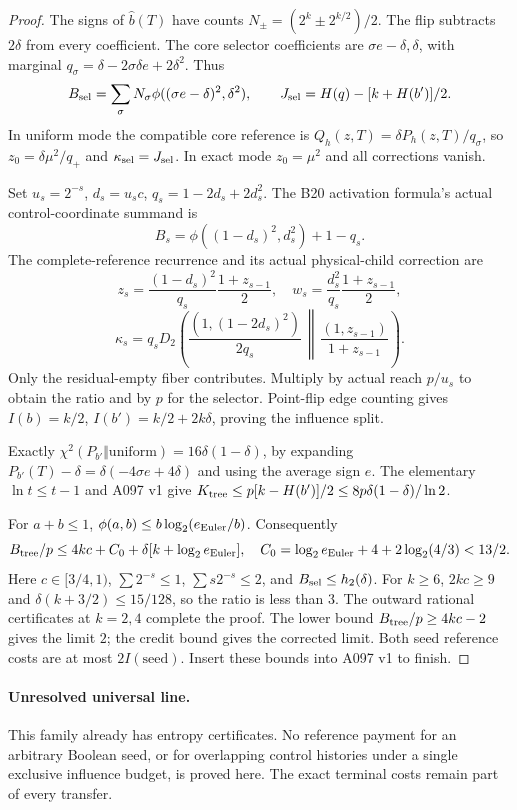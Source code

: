 \documentclass[11pt]{article}
\begin{document}
\begin{proof}
The signs of $\widehat b(T)$ have counts
$N_\pm=(2^k\pm2^{k/2})/2$. The flip subtracts $2\delta$ from every
coefficient. The core selector coefficients are $\sigma e-\delta,\delta$,
with marginal $q_\sigma=\delta-2\sigma\delta e+2\delta^2$. Thus
\[
B_{\rm sel}=\sum_\sigma N_\sigma
 \phi((\sigma e-\delta)^2,\delta^2),\qquad
J_{\rm sel}=H(q)-[k+H(b')]/2.
\]
In uniform mode the compatible core reference is
$Q_h(z,T)=\delta P_h(z,T)/q_\sigma$, so
$z_0=\delta\mu^2/q_+$ and $\kappa_{\rm sel}=J_{\rm sel}$.
In exact mode $z_0=\mu^2$ and all corrections vanish.

Set $u_s=2^{-s}$, $d_s=u_s c$, $q_s=1-2d_s+2d_s^2$.
The B20 activation formula's actual control-coordinate summand is
\[
B_s=\phi((1-d_s)^2,d_s^2)+1-q_s.
\]
The complete-reference recurrence and its actual physical-child correction are
\[
z_s=\frac{(1-d_s)^2}{q_s}\frac{1+z_{s-1}}2,\quad
w_s=\frac{d_s^2}{q_s}\frac{1+z_{s-1}}2,
\]
\[
\kappa_s=q_s D_2\!\left(
\frac{(1,(1-2d_s)^2)}{2q_s}\,\middle\Vert\,
\frac{(1,z_{s-1})}{1+z_{s-1}}\right).
\]
Only the residual-empty fiber contributes. Multiply by actual reach
$p/u_s$ to obtain the ratio and by $p$ for the selector. Point-flip edge
counting gives $I(b)=k/2$, $I(b')=k/2+2k\delta$, proving the influence split.

Exactly $\chi^2(P_{b'}\Vert\mathrm{uniform})=16\delta(1-\delta)$,
by expanding $P_{b'}(T)-\delta=\delta(-4\sigma e+4\delta)$ and using the
average sign $e$. The elementary $\ln t\le t-1$ and A097 v1 give
$K_{\rm tree}\le p[k-H(b')]/2\le8p\delta(1-\delta)/\ln2$.

For $a+b\le1$, $\phi(a,b)\le b\log_2(e_{\rm Euler}/b)$. Consequently
\[
 B_{\rm tree}/p\le4kc+C_0+\delta[k+\log_2 e_{\rm Euler}],
 \quad C_0=\log_2 e_{\rm Euler}+4+2\log_2(4/3)<13/2.
\]
Here $c\in[3/4,1)$, $\sum2^{-s}\le1$, $\sum s2^{-s}\le2$, and
$B_{\rm sel}\le h_2(\delta)$. For $k\ge6$,
$2kc\ge9$ and $\delta(k+3/2)\le15/128$, so the ratio is less than $3$.
The outward rational certificates at $k=2,4$ complete the proof.
The lower bound $B_{\rm tree}/p\ge4kc-2$ gives the limit $2$;
the credit bound gives the corrected limit. Both seed reference costs
are at most $2I(\mathrm{seed})$. Insert these bounds into A097 v1 to finish.
\end{proof}

\paragraph{Unresolved universal line.}
This family already has entropy certificates. No reference payment for an
arbitrary Boolean seed, or for overlapping control histories under a single
exclusive influence budget, is proved here. The exact terminal costs remain
part of every transfer.
\end{document}
